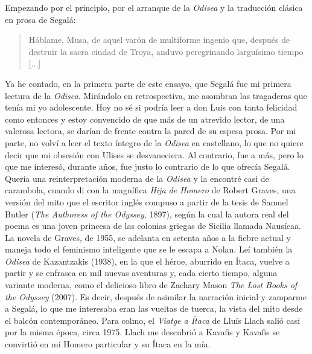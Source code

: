 Empezando por el principio, por el arranque de la \emph{Odisea} y la traducción clásica en prosa de Segalá:

\begin{quotation}
Háblame, Musa, de aquel varón de multiforme ingenio que, después de destruir la sacra ciudad de Troya, anduvo peregrinando larguísimo tiempo [...]
\end{quotation}

Ya he contado, en la primera parte de este ensayo, que Segalá fue mi primera lectura de la \emph{Odisea}. Mirándolo en retrospectiva, me asombran las tragaderas que tenía mi yo adolescente. Hoy no sé si podría leer a don Luis con tanta felicidad como entonces y estoy convencido de que más de un atrevido lector, de una valerosa lectora, se darían de frente contra la pared de su espesa prosa. Por mi parte, no volví a leer el texto íntegro de la \emph{Odisea} en castellano, lo que no quiere decir que mi obsesión con Ulises se desvaneciera. Al contrario, fue a más, pero lo que me interesó, durante años, fue justo lo contrario de lo que ofrecía Segalá. Quería una reinterpretación moderna de la \emph{Odisea} y la encontré casi de carambola, cuando di con la magnífica \emph{Hija de Homero} de Robert Graves, una versión del mito que el escritor inglés compuso a partir de la tesis de Samuel Butler (\emph{The Authoress of the Odyssey}, 1897), según la cual la autora real del poema es una joven princesa de las colonias griegas de Sicilia llamada Nausícaa. La novela de Graves, de 1955, se adelanta en setenta años a la fiebre actual y maneja todo el feminismo inteligente que se le escapa a Nolan. Leí también la \emph{Odisea} de Kazantzakis (1938), en la que el héroe, aburrido en Ítaca, vuelve a partir y se enfrasca en mil nuevas aventuras y, cada cierto tiempo, alguna variante moderna, como el delicioso libro de Zachary Mason \emph{The Lost Books of the Odyssey} (2007). Es decir, después de asimilar la narración inicial y zamparme a Segalá, lo que me interesaba eran las vueltas de tuerca, la vista del mito desde el balcón contemporáneo. Para colmo, el \emph{Viatge a Ítaca} de Lluís Llach salió casi por la misma época, circa 1975. Llach me descubrió a Kavafis y Kavafis se convirtió en mi Homero particular y su Ítaca en la mía.

